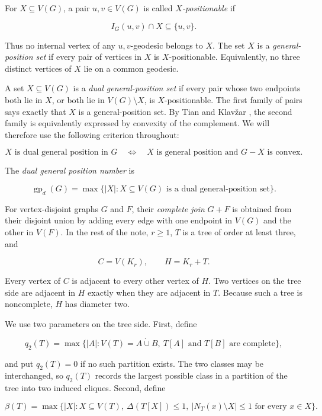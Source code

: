 \documentclass[11pt,a4paper]{article}
\providecommand{\Needspace}[1]{}
\numberwithin{equation}{section}
\begin{document}
For \(X\subseteq V(G)\), a pair \(u,v\in V(G)\) is called
\emph{\(X\)-positionable} if

\[
I_G(u,v)\cap X\subseteq\{u,v\}.
\]

Thus no internal vertex of any \(u,v\)-geodesic belongs to \(X\). The
set \(X\) is a \emph{general-position set} if every pair of vertices in
\(X\) is \(X\)-positionable. Equivalently, no three distinct vertices of
\(X\) lie on a common geodesic.

A set \(X\subseteq V(G)\) is a \emph{dual general-position set} if every
pair whose two endpoints both lie in \(X\), or both lie in
\(V(G)\setminus X\), is \(X\)-positionable. The first family of pairs
says exactly that \(X\) is a general-position set. By Tian and Klav\v{z}ar
\cite[Theorem 3.1]{tian-klavzar-variety}, the second family is equivalently expressed by
convexity of the complement. We will therefore use the following
criterion throughout:

\nopagebreak[4]
\[
X\text{ is dual general position in }G
\quad\Longleftrightarrow\quad
X\text{ is general position and }G-X\text{ is convex}.
\]

\Needspace{6\baselineskip}
The \emph{dual general position number} is

\[
\operatorname{gp}_d(G)=
\max\{|X|:X\subseteq V(G)\text{ is a dual general-position set}\}.
\]

For vertex-disjoint graphs \(G\) and \(F\), their \emph{complete join}
\(G+F\) is obtained from their disjoint union by adding every edge with
one endpoint in \(V(G)\) and the other in \(V(F)\). In the rest of the
note, \(r\ge 1\), \(T\) is a tree of order at least three, and

\[
C=V(K_r),\qquad H=K_r+T.
\]

Every vertex of \(C\) is adjacent to every other vertex of \(H\). Two
vertices on the tree side are adjacent in \(H\) exactly when they are
adjacent in \(T\). Because such a tree is noncomplete, \(H\) has
diameter two.

We use two parameters on the tree side. First, define

\[
q_2(T)=\max\{|A|:V(T)=A\mathbin{\dot\cup}B,
\ T[A]\text{ and }T[B]\text{ are complete}\},
\]

and put \(q_2(T)=0\) if no such partition exists. The two classes may be
interchanged, so \(q_2(T)\) records the largest possible class in a
partition of the tree into two induced cliques. Second, define

\[
\beta(T)=\max\bigl\{|X|:X\subseteq V(T),\ \Delta(T[X])\le 1,
\ |N_T(x)\setminus X|\le 1\text{ for every }x\in X\bigr\}.
\]
\end{document}
